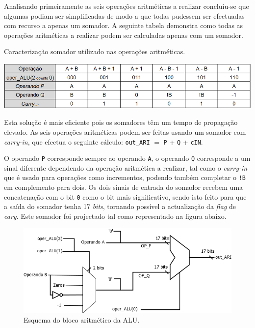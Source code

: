 \documentclass[11pt]{article}
\numberwithin{equation}{section}
\begin{document}
Analisando primeiramente as seis operações aritméticas a realizar concluiu-se que algumas podiam ser simplificadas de modo a que todas pudessem ser efectuadas com recurso a apenas um somador. A seguinte tabela demonstra como todas as operações aritméticas a realizar podem ser calculadas apenas com um somador.

\begin{table}[h]
	\centering
	\caption{Caracterização somador utilizado nas operações aritméticas.}
	\vspace{-2mm}
 	\includegraphics[keepaspectratio=true, scale=0.35]{tabelas/adder}
\end{table}

Esta solução é mais eficiente pois os somadores têm um tempo de propagação elevado. As seis operações aritméticas podem ser feitas usando um somador com \textit{carry-in}, que efectua o seguinte cálculo: \texttt{out\_ARI} $=$ \texttt{P} + \texttt{Q} + \texttt{cIN}. 

O operando \texttt{P} corresponde sempre ao operando \texttt{A}, o operando \texttt{Q} corresponde a  um sinal diferente dependendo da operação aritmética a realizar, tal como o \textit{carry-in} que é usado para operações como incrementos, podendo também completar o \texttt{!B} em complemento para dois. Os dois sinais de entrada do somador recebem uma concatenação com o bit \texttt{0} como o bit mais significativo, sendo isto feito para que a saída do somador tenha 17 \textit{bits}, tornando possível a actualização da \textit{flag} de \textit{cary}. Este somador foi projectado tal como representado na figura abaixo.

\vspace{1mm}

\begin{figure}[H]
	\centering
	\includegraphics[keepaspectratio=true, scale=0.55]{imagens/Arit}
	\caption{Esquema do bloco aritmético da ALU.}
	\vspace{-0.8em}
\end{figure}
\end{document}
